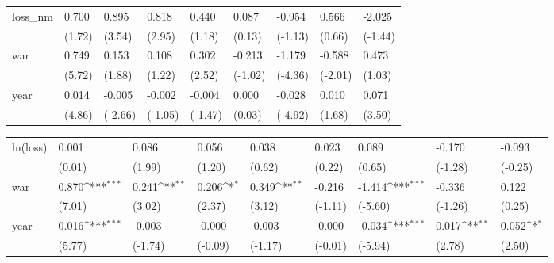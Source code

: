 \begin{tabular}{p{1.5cm} p{2cm} p{1.7cm} p{1.7cm} p{1.7cm} p{1.7cm} p{1.7cm} p{1.7cm} p{1.7cm}}
\hline
loss\_nm         &    0.700         &    0.895\sym{***}&    0.818\sym{**} &    0.440         &    0.087         &   -0.954         &    0.566         &   -2.025         \\
                &   (1.72)         &   (3.54)         &   (2.95)         &   (1.18)         &   (0.13)         &  (-1.13)         &   (0.66)         &  (-1.44)         \\
war             &    0.749\sym{***}&    0.153         &    0.108         &    0.302\sym{*}  &   -0.213         &   -1.179\sym{***}&   -0.588\sym{*}  &    0.473         \\
                &   (5.72)         &   (1.88)         &   (1.22)         &   (2.52)         &  (-1.02)         &  (-4.36)         &  (-2.01)         &   (1.03)         \\
year            &    0.014\sym{***}&   -0.005\sym{**} &   -0.002         &   -0.004         &    0.000         &   -0.028\sym{***}&    0.010         &    0.071\sym{**} \\
                &   (4.86)         &  (-2.66)         &  (-1.05)         &  (-1.47)         &   (0.03)         &  (-4.92)         &   (1.68)         &   (3.50)         \\
\end{tabular}
\def\sym#1{\ifmmode^{#1}\else\(^{#1}\)\fi}
\begin{tabular}{p{1.5cm} p{2cm} p{1.7cm} p{1.7cm} p{1.7cm} p{1.7cm} p{1.7cm} p{1.7cm} p{1.7cm}}
\hline
ln(loss)        &    0.001         &    0.086         &    0.056         &    0.038         &    0.023         &    0.089         &   -0.170         &   -0.093         \\
                &   (0.01)         &   (1.99)         &   (1.20)         &   (0.62)         &   (0.22)         &   (0.65)         &  (-1.28)         &  (-0.25)         \\
war             &    0.870\sym{***}&    0.241\sym{**} &    0.206\sym{*}  &    0.349\sym{**} &   -0.216         &   -1.414\sym{***}&   -0.336         &    0.122         \\
                &   (7.01)         &   (3.02)         &   (2.37)         &   (3.12)         &  (-1.11)         &  (-5.60)         &  (-1.26)         &   (0.25)         \\
year            &    0.016\sym{***}&   -0.003         &   -0.000         &   -0.003         &   -0.000         &   -0.034\sym{***}&    0.017\sym{**} &    0.052\sym{*}  \\
                &   (5.77)         &  (-1.74)         &  (-0.09)         &  (-1.17)         &  (-0.01)         &  (-5.94)         &   (2.78)         &   (2.50)         \\
\end{tabular}
